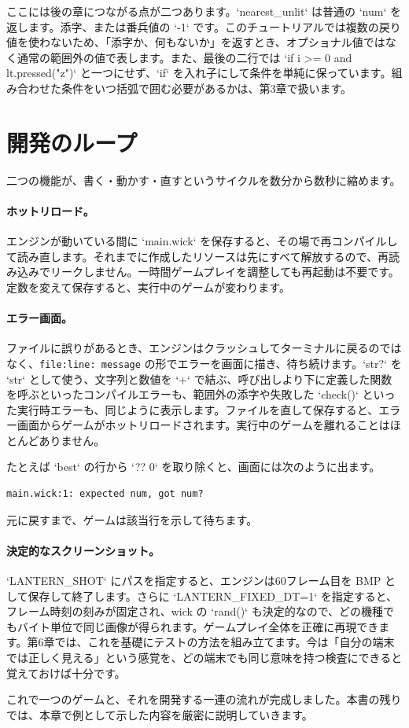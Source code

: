 \noindent
ここには後の章につながる点が二つあります。`nearest_unlit` は普通の `num` を返します。添字、または番兵値の `-1` です。このチュートリアルでは複数の戻り値を使わないため、「添字か、何もないか」を返すとき、オプショナル値ではなく通常の範囲外の値で表します。また、最後の二行では `if i >= 0 and lt.pressed("z")` と一つにせず、`if` を入れ子にして条件を単純に保っています。組み合わせた条件をいつ括弧で囲む必要があるかは、第3章で扱います。

\section{開発のループ}

二つの機能が、書く・動かす・直すというサイクルを数分から数秒に縮めます。

\paragraph{ホットリロード。} エンジンが動いている間に `main.wick` を保存すると、その場で再コンパイルして読み直します。それまでに作成したリソースは先にすべて解放するので、再読み込みでリークしません。一時間ゲームプレイを調整しても再起動は不要です。定数を変えて保存すると、実行中のゲームが変わります。

\paragraph{エラー画面。} ファイルに誤りがあるとき、エンジンはクラッシュしてターミナルに戻るのではなく、\texttt{file:line: message} の形でエラーを画面に描き、待ち続けます。`str?` を `str` として使う、文字列と数値を `+` で結ぶ、呼び出しより下に定義した関数を呼ぶといったコンパイルエラーも、範囲外の添字や失敗した `check()` といった実行時エラーも、同じように表示します。ファイルを直して保存すると、エラー画面からゲームがホットリロードされます。実行中のゲームを離れることはほとんどありません。

たとえば `best` の行から `?? 0` を取り除くと、画面には次のように出ます。

\begin{lstlisting}[basicstyle=\ttfamily\small,keywordstyle={}]
main.wick:1: expected num, got num?
\end{lstlisting}

\noindent
元に戻すまで、ゲームは該当行を示して待ちます。

\paragraph{決定的なスクリーンショット。} `LANTERN_SHOT` にパスを指定すると、エンジンは60フレーム目を BMP として保存して終了します。さらに `LANTERN_FIXED_DT=1` を指定すると、フレーム時刻の刻みが固定され、wick の `rand()` も決定的なので、どの機種でもバイト単位で同じ画像が得られます。ゲームプレイ全体を正確に再現できます。第6章では、これを基礎にテストの方法を組み立てます。今は「自分の端末では正しく見える」という感覚を、どの端末でも同じ意味を持つ検査にできると覚えておけば十分です。

これで一つのゲームと、それを開発する一連の流れが完成しました。本書の残りでは、本章で例として示した内容を厳密に説明していきます。
